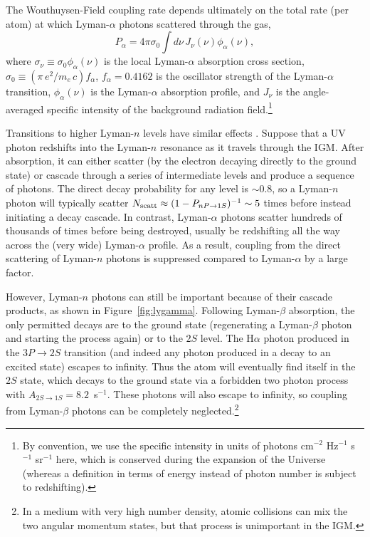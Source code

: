 The Wouthuysen-Field coupling rate depends ultimately on the total rate (per atom) at which Lyman-$\alpha$ photons scattered through the gas,
\begin{equation}
P_\alpha = 4 \pi \sigma_0 \int d \nu \, J_\nu(\nu) \phi_\alpha(\nu),
\label{eq:palpha}
\end{equation}
where $\sigma_\nu \equiv \sigma_0 \phi_\alpha(\nu)$ is the local Lyman-$\alpha$ absorption cross section, $\sigma_0 \equiv (\pi \, e^2/m_e \, c) f_{\alpha}$, $f_\alpha=0.4162$ is the oscillator strength of the Lyman-$\alpha$ transition, $\phi_\alpha(\nu)$ is the Lyman-$\alpha$ absorption profile, and $J_\nu$ is the angle-averaged specific intensity of the background radiation field.\footnote{By convention, we use the specific intensity in units of photons cm$^{-2}$ Hz$^{-1}$ s$^{-1}$ sr$^{-1}$ here, which is conserved during the expansion of the Universe (whereas a definition in terms of energy instead of photon number is subject to redshifting).}   

Transitions to higher Lyman-$n$ levels have similar effects \cite{hirata06, pritchard06}. Suppose that a UV photon redshifts into the Lyman-$n$ resonance as it travels through the IGM.  After absorption, it can either scatter (by the electron decaying directly to the ground state) or cascade through a series of intermediate levels and produce a sequence of photons.  The direct decay probability for any level is $\sim 0.8$, so a Lyman-$n$ photon will typically scatter $N_{\rm scatt} \approx (1-P_{nP\rightarrow1S})^{-1} \sim 5$ times before instead initiating a decay cascade.  In contrast, Lyman-$\alpha$ photons scatter hundreds of thousands of times before being destroyed, usually be redshifting all the way across the (very wide) Lyman-$\alpha$ profile.  As a result, coupling from the direct scattering of Lyman-$n$ photons is suppressed compared to Lyman-$\alpha$ by a large factor.

However, Lyman-$n$ photons can still be important because of their cascade products, as shown in Figure~\ref{fig:lygamma}.  Following Lyman-$\beta$ absorption, the only permitted decays are to the ground state (regenerating a Lyman-$\beta$ photon and starting the process again) or to the $2S$ level.  The H$\alpha$ photon produced in the $3P \rightarrow 2S$ transition (and indeed any photon produced in a decay to an excited state) escapes to infinity. Thus the atom will eventually find itself in the $2S$ state, which decays to the ground state via a forbidden two photon process with $A_{2S\rightarrow1S}=8.2$~s$^{-1}$.  These photons will also escape to infinity, so coupling from Lyman-$\beta$ photons can be completely neglected.\footnote{In a medium with very high number density, atomic collisions can mix the two angular momentum states, but that process is unimportant in the IGM.}

